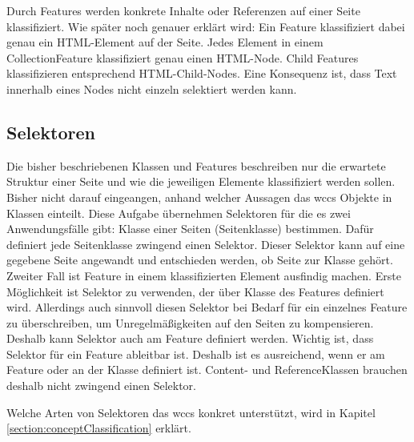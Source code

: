         Durch Features werden konkrete Inhalte oder Referenzen auf einer Seite klassifiziert.
        Wie später noch genauer erklärt wird:
        Ein Feature klassifiziert dabei genau ein HTML-Element auf der Seite.
        Jedes Element in einem CollectionFeature klassifiziert genau einen HTML-Node.
        Child Features klassifizieren entsprechend HTML-Child-Nodes.
        Eine Konsequenz ist, dass Text innerhalb eines Nodes nicht einzeln selektiert werden kann.

    \subsection{Selektoren}
        \label{section:conteptSelectors}
        Die bisher beschriebenen Klassen und Features beschreiben nur
        die erwartete Struktur einer Seite und wie die jeweiligen Elemente klassifiziert
        werden sollen.
        Bisher nicht darauf eingeangen, anhand welcher Aussagen das \gls{wccs} Objekte
        in Klassen einteilt.
        Diese Aufgabe übernehmen Selektoren für die es zwei Anwendungsfälle gibt:
        Klasse einer Seiten (Seitenklasse) bestimmen.
        Dafür definiert jede Seitenklasse zwingend einen Selektor.
        Dieser Selektor kann auf eine gegebene Seite angewandt und entschieden werden,
        ob Seite zur Klasse gehört.
        Zweiter Fall ist Feature in einem klassifizierten Element ausfindig machen.
        Erste Möglichkeit ist Selektor zu verwenden, der über Klasse des Features definiert wird.
        Allerdings auch sinnvoll diesen Selektor bei Bedarf für ein einzelnes Feature zu überschreiben,
        um Unregelmäßigkeiten auf den Seiten zu kompensieren.
        Deshalb kann Selektor auch am Feature definiert werden.
        Wichtig ist, dass Selektor für ein Feature ableitbar ist.
        Deshalb ist es ausreichend, wenn er am Feature oder an der Klasse definiert ist.
        Content- und ReferenceKlassen brauchen deshalb nicht zwingend einen Selektor.

        Welche Arten von Selektoren das \gls{wccs} konkret unterstützt,
        wird in Kapitel \ref{section:conceptClassification} erklärt.